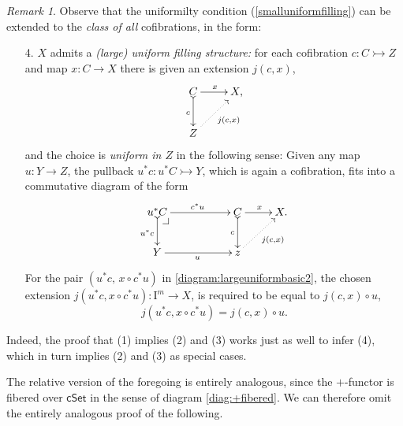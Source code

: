 \documentclass[11pt]{amsart}
\makeatletter
\newcommand{\cSet}{\ensuremath{\mathsf{cSet}}}
\newcommand{\mono}{\ensuremath{\rightarrowtail}}
\newcommand{\ra}{\ensuremath{\rightarrow}}
\newcommand{\I}{\ensuremath{\mathrm{I}}}
\theoremstyle{remark}
\newtheorem{remark}[theorem]{Remark}
\theoremstyle{definition}
\newcommand{\pbcorner}[1][dr]{\save*!/#1-1.2pc/#1:(-1,1)@^{|-}\restore}
\makeatother
\begin{document}
 \begin{remark}\label{remark:largeuniformfilling}
 Observe that the uniformilty condition (\ref{smalluniformfilling}) can be extended to the \emph{class of all} cofibrations, in the form:
 
 \begin{enumerate}
 \item[4.]\label{largeuniformfilling} $X$ admits a \emph{(large) uniform filling structure:} 
for each cofibration $c : C \mono Z$ and map $x : C\ra X$ there is given an extension $j(c,x)$,
\begin{equation}\label{diagram:largeuniformbasic}
\xymatrix{
C \ar@{>->}[d]_{c} \ar[r]^{x} & X, \\
Z\ar@{.>}[ru]_{j(c,x)} &
}
\end{equation}
and the choice is \emph{uniform in $Z$} in the following sense:
Given any map $u :Y \ra Z$, the pullback $u^*c : u^*C\mono Y$, which is again a cofibration, fits into a commutative diagram of the form
\begin{equation}\label{diagram:largeuniformbasic2}
\xymatrix{
u^*C \ar@{>->}[d]_{u^*c} \ar[rr]^{c^*u} \pbcorner &&  C \ar@{>->}[d]_{c} \ar[r]^{x} & X. \\
Y \ar[rr]_{u} && z \ar@{.>}[ru]_{j(c,x)} &
}
\end{equation}
For the pair $(u^*c,\, x\circ c^*u)$ in \eqref{diagram:largeuniformbasic2}, the chosen extension $j(u^*c,x\circ c^*u): \I^m \ra X$, is required to be equal to  $j(c,x)\circ u$,
\begin{equation}\label{eq:largeuniformfillers}
j(u^*c,x\circ c^*u) = j(c,x) \circ u.
\end{equation}
\end{enumerate}
Indeed, the proof that (1) implies (2) and (3) works just as well to infer (4), which in turn implies (2) and (3) as special cases.
\end{remark}

The relative version of the foregoing is entirely analogous, since the $+$-functor is fibered over $\cSet$ in the sense of diagram \eqref{diag:+fibered}.  We can therefore omit the entirely analogous proof of the following.
 
\end{document}
